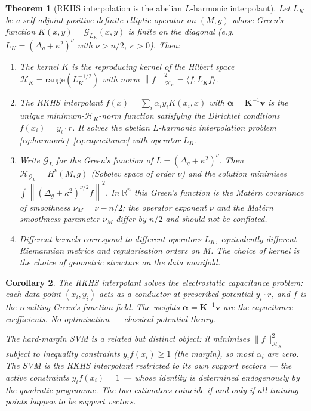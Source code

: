 \documentclass[11pt, a4paper]{article}
\theoremstyle{plain}
\newtheorem{theorem}{Theorem}[section]
\newtheorem{corollary}[theorem]{Corollary}
\theoremstyle{definition}
\newcommand{\R}{\mathbb{R}}
\newcommand{\norm}[1]{\left\|#1\right\|}
\newcommand{\Gr}{\mathcal{G}}   %
\begin{document}
\begin{theorem}[RKHS interpolation is the abelian $L$-harmonic interpolant]%
\label{thm:svm-ym}
Let $L_K$ be a self-adjoint positive-definite elliptic operator on $(M,g)$
whose Green's function $K(x,y) = \Gr_{L_K}(x,y)$ is \emph{finite on the
diagonal} (e.g.\ $L_K = (\Delta_g+\kappa^2)^\nu$ with $\nu > n/2$,
$\kappa > 0$). Then:
\begin{enumerate}[label=(\roman*), itemsep=3pt]
  \item The kernel $K$ is the reproducing kernel of the Hilbert space
        $\mathcal{H}_K = \mathrm{range}(L_K^{-1/2})$ with norm
        $\norm{f}^2_{\mathcal{H}_K} = \langle f, L_K f\rangle$.
  \item The RKHS interpolant $f(x) = \sum_i\alpha_i y_i K(x_i,x)$ with
        $\boldsymbol{\alpha} = \mathbf{K}^{-1}\mathbf{v}$ is the unique
        minimum-$\mathcal{H}_K$-norm function satisfying the Dirichlet conditions
        $f(x_i) = y_i \cdot r$. It solves the abelian $L$-harmonic interpolation
        problem \eqref{eq:harmonic}--\eqref{eq:capacitance} with operator $L_K$.
  \item Write $\Gr_{L}$ for the Green's function of $L = (\Delta_g+\kappa^2)^{\nu}$.
        Then $\mathcal{H}_{\Gr_L} = H^{\nu}(M,g)$ (Sobolev space of order $\nu$)
        and the solution minimises $\int\norm{(\Delta_g+\kappa^2)^{\nu/2}f}^2$.
        In $\R^n$ this Green's function is the Mat\'ern covariance of
        \emph{smoothness} $\nu_M = \nu - n/2$; the operator exponent $\nu$ and
        the Mat\'ern smoothness parameter $\nu_M$ differ by $n/2$ and should
        not be conflated.
  \item Different kernels correspond to different operators $L_K$, equivalently
        different Riemannian metrics and regularisation orders on $M$. The choice
        of kernel is the choice of geometric structure on the data manifold.
\end{enumerate}
\end{theorem}

\begin{corollary}\label{cor:svm-ym}
The RKHS interpolant solves the electrostatic capacitance problem: each data
point $(x_i, y_i)$ acts as a conductor at prescribed potential $y_i \cdot r$,
and $f$ is the resulting Green's function field. The weights
$\boldsymbol{\alpha} = \mathbf{K}^{-1}\mathbf{v}$ are the capacitance
coefficients. No optimisation --- classical potential theory.

The hard-margin SVM is a related but distinct object: it minimises
$\|f\|^2_{\mathcal{H}_K}$ subject to \emph{inequality} constraints
$y_i f(x_i) \geq 1$ (the margin), so most $\alpha_i$ are zero. The SVM is
the RKHS interpolant \emph{restricted to its own support vectors} --- the active
constraints $y_i f(x_i) = 1$ --- whose identity is determined endogenously by
the quadratic programme. The two estimators coincide if and only if all training
points happen to be support vectors.
\end{corollary}
\end{document}
